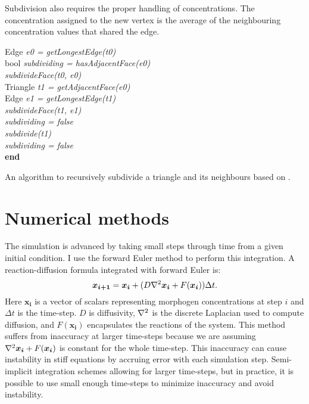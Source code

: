 Subdivision also requires the proper handling of concentrations. The concentration assigned to the new vertex is the average of the neighbouring concentration values that shared the edge.

\begin{algorithm}[!ht]
  {
   Edge \textit{e0 = getLongestEdge(t0)}\\
   bool \textit{subdividing = hasAdjacentFace(e0)}\\
   \textit{subdivideFace(t0, e0)}\\
   {
    {
      Triangle \textit{t1 = getAdjacentFace(e0)}\\
      Edge \textit{e1 = getLongestEdge(t1)}\\
      {
       \textit{subdivideFace(t1, e1)}\\
       \textit{subdividing = false}\\
      }{
        \textit{subdivide(t1)}\\   
      }
    }{
     \textit{subdividing = false}\\
    }
   }
  }
  \textbf{end}
  \caption{An algorithm to recursively subdivide a triangle and its neighbours based on \citep{rivara1998}.}
  \label{alg:subdivisionAlgorithm}
\end{algorithm}

\section{Numerical methods}

The simulation is advanced by taking small steps through time from a given initial condition. I use the forward Euler method \citep{solomon2015} to perform this integration. A reaction-diffusion formula integrated with forward Euler is:
\begin{equation}
	\boldsymbol{x_{i+1}} = \boldsymbol{x_{i}} + (D\nabla^2{}\boldsymbol{x_i} + F(\boldsymbol{x_i}))\Delta t. \\
\end{equation}
Here $\boldsymbol{x_i}$ is a vector of scalars representing morphogen concentrations at step $i$ and $\Delta t$ is the time-step. $D$ is diffusivity, $\nabla^2{}$ is the discrete Laplacian used to compute diffusion, and $F(\boldsymbol{x_i})$ encapsulates the reactions of the system. This method suffers from inaccuracy at larger time-steps because we are assuming $\nabla^2{}\boldsymbol{x_i} + F(\boldsymbol{x_i})$ is constant for the whole time-step. This inaccuracy can cause instability in stiff equations by accruing error with each simulation step. Semi-implicit integration schemes \citep{Nie2006} allowing for larger time-steps, but in practice, it is possible to use small enough time-steps to minimize inaccuracy and avoid instability. 


